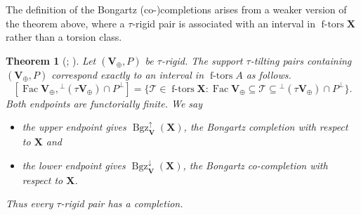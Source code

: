 \documentclass[11pt,reqno]{amsart}
\theoremstyle{plain}
\newtheorem{theorem}{Theorem}[section]
\theoremstyle{definition}
\numberwithin{equation}{section}
\newcommand\hua{\mathcal}
\newcommand\<{\langle}
\renewcommand\>{\rangle}
\newcommand\Add{\operatorname{add}}
\newcommand\Hom{\operatorname{Hom}}
\newcommand\End{\operatorname{End}}
\newcommand{\C}{\operatorname{\hua{C}}} %
\newcommand{\on}[1]{\operatorname{#1}}
\newcommand{\pcts}[1]{\mathbf{#1}}%
\newcommand{\pcto}[1]{\mathbf{#1}_\oplus} %
\newcommand{\Bgzp}[2]{\operatorname{Bgz}^{\uparrow}_{#2}(#1)}
\newcommand{\Bgzm}[2]{\operatorname{Bgz}^{\downarrow}_{#2}(#1)}
\begin{document}
The definition of the Bongartz (co-)completions arises from a weaker version of the theorem above,
where a $\tau$-rigid pair is associated with an interval in $\on{f-tors}\pcts{X}$ rather than a torsion class.

\begin{theorem}[{\cite[Prop.~2.9, Thm.~2.10]{AIR};
\cite[Thm.~2.8]{AIR24}}]\label{thm:app-tau-endpoints}
Let $(\pcto{V},P)$ be $\tau$-rigid. 
The support $\tau$-tilting pairs containing $(\pcto{V},P)$ correspond exactly to an interval in $\on{f-tors}A$ as follows.
\begin{equation}\label{eq:app-tau-interval}
 [\on{Fac}\pcto{V},{}^\perp(\tau \pcto{V})\cap P^\perp]=
 \bigl\{\mathcal T\in\on{f-tors}\pcts{X}:
 \on{Fac}\pcto{V}\subseteq\mathcal T
 \subseteq{}^\perp(\tau \pcto{V})\cap P^\perp\bigr\}.
\end{equation}
Both endpoints are functorially finite.
We say
\begin{itemize}
    \item the upper endpoint gives $\Bgzp{\pcts{X}}{\pcts{V}}$, the \emph{Bongartz completion} with respect to $\pcts{X}$ and
    \item the lower endpoint gives $\Bgzm{\pcts{X}}{\pcts{V}}$, the \emph{Bongartz co-completion} with respect to $\pcts{X}$.
\end{itemize}
Thus every $\tau$-rigid pair has a completion.
\end{theorem}



\end{document}
